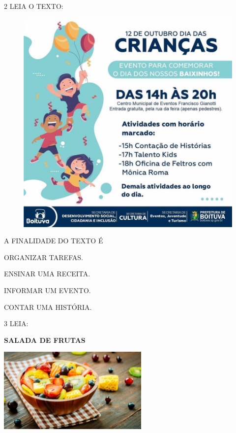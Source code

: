 \pagebreak
\num{2} LEIA O TEXTO:

\begin{figure}[htpb!]
\centering
\includegraphics[width=\textwidth]{media/image158.jpg}
\end{figure}

A FINALIDADE DO TEXTO É

\begin{escolha}
\item ORGANIZAR TAREFAS.

\item ENSINAR UMA RECEITA.

\item INFORMAR UM EVENTO.

\item CONTAR UMA HISTÓRIA.
\end{escolha}

\pagebreak
\num{3} LEIA:

\textbf{SALADA DE FRUTAS}

\includegraphics[width=2.90350in,height=1.63264in]{media/image159.jpg}

